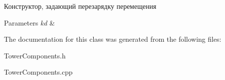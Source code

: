 Конструктор, задающий перезарядку перемещения 


\begin{DoxyParams}{Parameters}
{\em kd} & \\
\hline
\end{DoxyParams}


The documentation for this class was generated from the following files\+:\begin{DoxyCompactItemize}
\item 
Tower\+Components.\+h\item 
Tower\+Components.\+cpp\end{DoxyCompactItemize}
